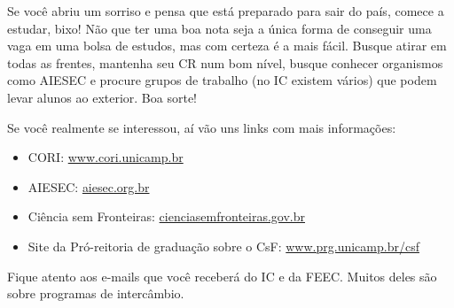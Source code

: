 Se você abriu um sorriso e pensa que está preparado para sair do país, comece a
estudar, bixo! Não que ter uma boa nota seja a única forma de conseguir uma vaga
em uma bolsa de estudos, mas com certeza é a mais fácil.  Busque atirar em todas
as frentes, mantenha seu CR num bom nível, busque conhecer organismos como
AIESEC e procure grupos de trabalho (no IC existem vários) que podem levar
alunos ao exterior. Boa sorte!

Se você realmente se interessou, aí vão uns links com mais informações:

\begin{itemize}
    \item  CORI: \url{www.cori.unicamp.br}
    \item  AIESEC: \url{aiesec.org.br}
    \item  Ciência sem Fronteiras: \url{cienciasemfronteiras.gov.br}
    \item  Site da Pró-reitoria de graduação sobre o CsF: \url{www.prg.unicamp.br/csf}
\end{itemize}

Fique atento aos e-mails que você receberá do IC e da FEEC. Muitos deles são
sobre programas de intercâmbio.
